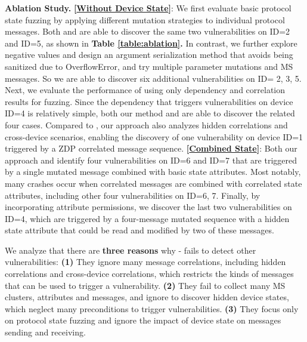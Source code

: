 \documentclass[10pt,journal,compsoc]{IEEEtran}
\begin{document}
\textbf{Ablation Study.} \textbf{[\underline{Without Device State}]}: We first evaluate basic protocol state fuzzing by applying different mutation strategies to individual protocol messages. Both \textbf{{\color{Orange}{B3}}} and \textbf{{\color{Orange}{B4}}} are able to discover the same two vulnerabilities on ID=2 and ID=5, as shown in \textbf{Table \ref{table:ablation}.} In contrast, we further explore negative values and design an argument serialization method that avoids being sanitized due to OverflowError, and try multiple parameter mutations and MS messages. So we are able to discover six additional vulnerabilities on ID= 2, 3, 5. Next, we evaluate the performance of using only dependency and correlation results for fuzzing. Since the dependency that triggers vulnerabilities on device ID=4 is relatively simple, both our method and \textbf{{\color{Orange}{B3}}} are able to discover the related four cases. Compared to \textbf{{\color{Orange}{B1}}}, our approach also analyzes hidden correlations and cross-device scenarios, enabling the discovery of one vulnerability on device ID=1 triggered by a ZDP correlated message sequence. \textbf{[\underline{Combined State}]}: Both our approach and \textbf{{\color{Orange}{B4}}} identify four vulnerabilities on ID=6 and ID=7 that are triggered by a single mutated message combined with basic state attributes. Most notably, many crashes occur when correlated messages are combined with correlated state attributes, including other four vulnerabilities on ID=6, 7. Finally, by incorporating attribute permissions, we discover the last two vulnerabilities on ID=4, which are triggered by a four-message mutated sequence with a hidden state attribute that could be read and modified by two of these messages.

We analyze that there are \textbf{three reasons} why \textbf{{\color{Orange}{B1}}}-\textbf{{\color{Orange}{B4}}} fails to detect other vulnerabilities: \textbf{(1)} They ignore many message correlations, including hidden correlations and cross-device correlations, which restricts the kinds of messages that can be used to trigger a vulnerability. \textbf{(2)} They fail to collect many MS clusters, attributes and messages, and ignore to discover hidden device states, which neglect many preconditions to trigger vulnerabilities.  \textbf{(3)} They focus only on protocol state fuzzing and ignore the impact of device state on messages sending and receiving. \vspace{0.1cm}
\end{document}
